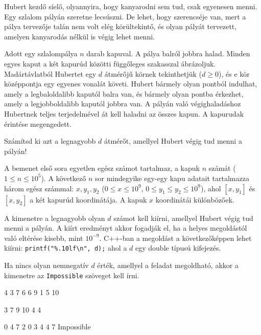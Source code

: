 





Hubert kezdő síelő, olyannyira, hogy kanyarodni sem tud, csak egyenesen menni. Egy szlalom pályán szeretne lecsúszni. De lehet, hogy szerencséje van, mert a pálya tervezője talán nem volt elég körültekintő, és olyan pályát tervezett, amelyen kanyarodás nélkül is végig lehet menni.

Adott egy szlalompálya $n$ darab kapuval. A pálya balról jobbra halad. Minden egyes kaput a két kapurúd közötti függőleges szakasszal ábrázoljuk. Madártávlatból Hubertet egy $d$ átmérőjű körnek tekinthetjük ($d \geq 0$), és e kör középpontja egy egyenes vonalát követi. Hubert bármely olyan pontból indulhat, amely a legbaloldalibb kaputól balra van, és bármely olyan pontba érkezhet, amely a legjobboldalibb kaputól jobbra van. A pályán való végighaladáshoz Hubertnek teljes terjedelmével át kell haladni az összes kapun. A kapurudak érintése megengedett.

Számítsd ki azt a legnagyobb $d$ átmérőt, amellyel Hubert végig tud menni a pályán!  

A bemenet első sora egyetlen egész számot tartalmaz, a kapuk $n$ számát ($1 \leq n \leq 10^5$). A következő $n$ sor mindegyike egy-egy kapu adatait tartalmazza három egész számmal: $x, y_1, y_2$ ($0 \leq x \leq 10^9$,
$0 \leq y_1 \leq y_2 \leq 10^9$), ahol $[x, y_1]$ és $[x, y_2]$ a két kapurúd koordinátája. A kapuk $x$ koordinátái különbözőek.

A kimenetre a legnagyobb olyan $d$ számot kell kiírni, amellyel Hubert végig tud menni a pályán. A kiírt eredményt akkor fogadják el, ha a helyes megoldástól való eltérése kisebb, mint $10^{-9}$. C++-ban a megoldást a következőképpen lehet kiírni:
\verb!printf("%.10lf\n", d);!
ahol a $d$ egy double típusú kifejezés.

Ha nincs olyan nemnegatív $d$ érték, amellyel a feladat megoldható, akkor a kimenetre az \texttt{Impossible} szöveget kell írni.


4 3 7
6 6 9
1 5 10
\sampleEND

3 7 9
10 4 4
\sampleEND

0 4 7
2 0 3
4 4 7
\sampleOUT
Impossible
\sampleEND



